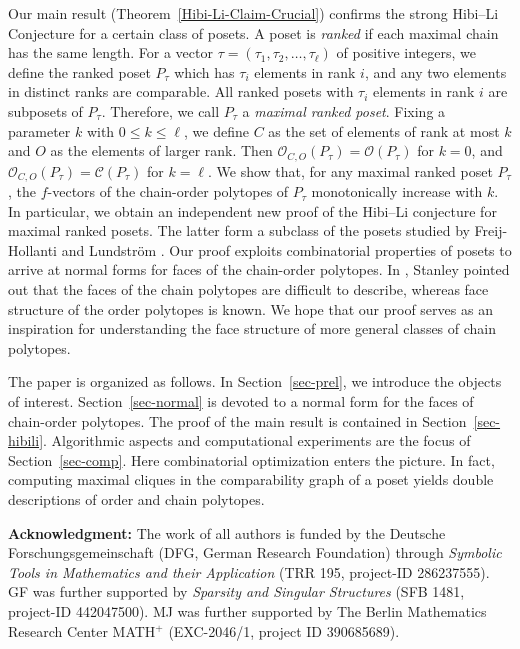 \documentclass[12pt,a4paper]{amsart}
\theoremstyle{definition}
\newcommand{\OP}{\mathcal{O}}
\newcommand{\CP}{\mathcal{C}}
\begin{document}
Our main result (Theorem~\ref{Hibi-Li-Claim-Crucial}) confirms the strong Hibi--Li Conjecture for a certain class of posets.
A poset is \emph{ranked} if each maximal chain has the same length.
For a vector $\tau=(\tau_1,\tau_2,\dots,\tau_\ell)$ of positive integers, we define the ranked poset $P_\tau$ which has $\tau_i$ elements in rank $i$, and any two elements in distinct ranks are comparable.
All ranked posets with $\tau_i$ elements in rank $i$ are subposets of $P_\tau$.
Therefore, we call $P_\tau$ a \emph{maximal ranked poset}.
Fixing a parameter $k$ with $0\leq k\leq\ell$, we define $C$ as the set of elements of rank at most $k$ and $O$ as the elements of larger rank.
Then $\OP_{C,O}(P_\tau)=\OP(P_\tau)$ for $k=0$,  and  $\OP_{C,O}(P_\tau)=\CP(P_\tau)$ for $k=\ell$.
We show that, for any maximal ranked poset $P_\tau$, the $f$-vectors of the chain-order polytopes of $P_\tau$ monotonically increase with $k$.
In particular, we obtain an independent new proof of the Hibi--Li conjecture for maximal ranked posets.
The latter form a subclass of the posets studied by Freij-Hollanti and Lundström \cite{freijhollanti2024fvector}.
Our proof exploits combinatorial properties of posets to arrive at normal forms for faces of the chain-order polytopes.
In \cite[p.~12]{Sta86}, Stanley pointed out that the faces of the chain polytopes are difficult to describe, whereas face structure of the order polytopes is known.
We hope that our proof serves as an inspiration for understanding the face structure of more general classes of chain polytopes.

The paper is organized as follows.
In Section~\ref{sec-prel}, we introduce the objects of interest.
Section~\ref{sec-normal} is devoted to a normal form for the faces of chain-order polytopes.
The proof of the main result is contained in Section~\ref{sec-hibili}.
Algorithmic aspects and computational experiments are the focus of Section~\ref{sec-comp}.
Here combinatorial optimization enters the picture.
In fact, computing maximal cliques in the comparability graph of a poset yields double descriptions of order and chain polytopes.

\noindent
\textbf{Acknowledgment:}
The work of all authors is funded by the Deutsche Forschungsgemeinschaft (DFG, German Research Foundation) through \textit{Symbolic Tools in Mathematics and their Application} (TRR 195, project-ID 286237555).
GF was further supported by \textit{Sparsity and Singular Structures} (SFB 1481, project-ID 442047500).
MJ was further supported by The Berlin Mathematics Research Center MATH$^+$ (EXC-2046/1, project ID 390685689).
\end{document}
